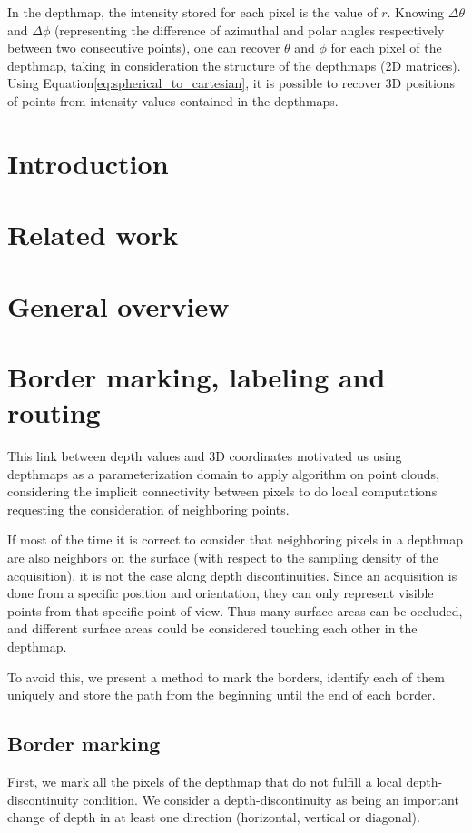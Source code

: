 \documentclass[11pt,fleqn]{book} %
\begin{document}
In the depthmap, the intensity stored for each pixel is the value of $r$. Knowing $\Delta\theta$ and $\Delta\phi$ (representing the difference of azimuthal and polar angles respectively between two consecutive points), one can recover $\theta$ and $\phi$ for each pixel of the depthmap, taking in consideration the structure of the depthmaps (2D matrices). 
Using Equation\eqref{eq:spherical_to_cartesian}, it is possible to recover 3D positions of points from intensity values contained in the depthmaps.

\section{Introduction}

\section{Related work}

\section{General overview}



\section{Border marking, labeling and routing}
\label{sec:border_marking}

This link between depth values and 3D coordinates motivated us using depthmaps as a parameterization domain to apply algorithm on point clouds, considering the implicit connectivity between pixels to do local computations requesting the consideration of neighboring points.

If most of the time it is correct to consider that neighboring pixels in a depthmap are also neighbors on the surface (with respect to the sampling density of the acquisition), it is not the case along depth discontinuities.
Since an acquisition is done from a specific position and orientation, they can only represent visible points from that specific point of view. Thus many surface areas can be occluded, and different surface areas could be considered touching each other in the depthmap.

To avoid this, we present a method to mark the borders, identify each of them uniquely and store the path from the beginning until the end of each border.

\subsection{Border marking}
First, we mark all the pixels of the depthmap that do not fulfill a local depth-discontinuity condition. We consider a depth-discontinuity as being an important change of depth in at least one direction (horizontal, vertical or diagonal).
\end{document}
